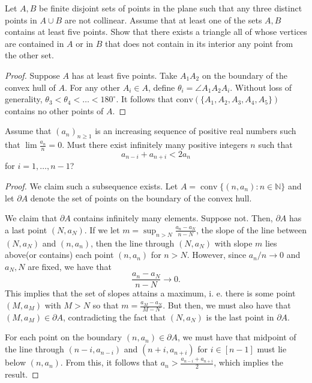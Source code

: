 \documentclass[11pt]{article}
\newcommand{\N}{\mathbb{N}}
\renewcommand{\>}{\rangle}
\newcommand{\<}{\langle}
\begin{document}
\begin{problem} Let $A, B$ be finite disjoint sets of points in the plane such that any three distinct points in $A \cup B$ are not collinear.  Assume that at least one of the sets $A, B$ contains at least five points.  Show that there exists a triangle all of whose vertices are contained in $A$ or in $B$ that does not contain in its interior any point from the other set.
\end{problem}
\begin{proof}
Suppose $A$ has at least five points.  Take $A_1A_2$ on the boundary of the convex hull of $A$.  For any other $A_i \in A$, define $\theta_i = \angle A_1A_2A_i$.  Without loss of generality, $\theta_3 < \theta_4 < \dots < 180^\circ$.  It follows that $\text{conv}(\{A_1, A_2, A_3, A_4, A_5\})$ contains no other points of $A$.
\end{proof}

\begin{problem}[Putnam 2001 B6] Assume that $(a_n)_{n \ge 1}$ is an increasing sequence of positive real numbers such that $\lim \frac{a_n}{n} = 0$.  Must there exist infinitely many positive integers $n$ such that 
$$a_{n-i} + a_{n+i} < 2a_n$$
for $i = 1, \dots, n-1$?
\end{problem}
\begin{proof}
We claim such a subsequence exists.   Let $A = \operatorname{conv}\{(n, a_n) : n \in \N\}$ and let $\partial A$ denote the set of points on the boundary of the convex hull.  

We claim that $\partial A$ contains infinitely many elements.  Suppose not.  Then, $\partial A$ has a last point $(N, a_N)$.  If we let $m = \sup_{n > N} \frac{a_n - a_N}{n - N}$, the slope of the line between $(N, a_N)$ and $(n, a_n)$, then the line through $(N, a_N)$ with slope $m$ lies above(or contains) each point $(n, a_n)$ for $n > N$.  However, since $a_n/n \to 0$ and $a_N, N$ are fixed, we have that $$\frac{a_n - a_N}{n - N} \to 0.$$
This implies that the set of slopes attains a maximum, i. e. there is some point $(M, a_M)$ with $M > N$ so that $m = \frac{a_M - a_N}{M - N}$.  But then, we must also have that $(M, a_M) \in \partial A$, contradicting the fact that $(N, a_N)$ is the last point in $\partial A$.

For each point on the boundary $(n, a_n) \in \partial A$, we must have that midpoint of the line through $(n-i, a_{n-i})$ and $(n+i, a_{n+i})$ for $i \in [n-1]$ must lie below $(n, a_n)$.  From this, it follows that $a_n > \frac{a_{n-i} + a_{n+i}}{2}$, which implies the result.  
\end{proof}
\end{document}
